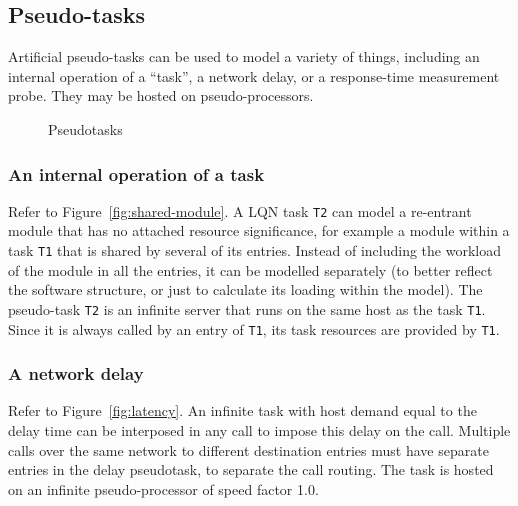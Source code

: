 \documentclass[11pt]{article}
\begin{document}
\subsection{Pseudo-tasks}
\label{sec:pseudo-tasks}

Artificial pseudo-tasks can be used to model a variety of things, including an internal
operation of a ``task'', a network delay, or a response-time measurement probe. They may be hosted
on pseudo-processors.

\begin{figure}
  \centering
  \quad
  \quad
  \quad
  \caption{Pseudotasks}
  \label{fig:pseudotasks}
\end{figure}

\subsubsection{An internal operation of a task}  
Refer to Figure~\ref{fig:shared-module}. A LQN task \texttt{T2} can model a re-entrant
module that has no attached resource significance, for example a module within a task \texttt{T1} that is
shared by several of its entries. Instead of including the workload of the module in all the entries, it
can be modelled separately (to better reflect the software structure, or just to calculate its loading
within the model). The pseudo-task \texttt{T2} is an infinite server that runs on the same host as the task
\texttt{T1}. Since it is always called by an entry of \texttt{T1}, its task resources are provided by \texttt{T1}.

\subsubsection{A network delay}
Refer to Figure~\ref{fig:latency}. An infinite task with host demand equal to the delay
time can be interposed in any call to impose this delay on the call. Multiple calls over the same
network to different destination entries must have separate entries in the delay pseudotask, to
separate the call routing. The task is hosted on an infinite pseudo-processor of speed factor 1.0.
\end{document}
